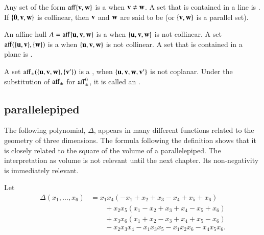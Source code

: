 	
\begin{definition}
  Any set of the form ${\operatorname{aff}}\{{\mathbf v},{\mathbf w}\}$ is a  when
  ${\mathbf v}\ne {\mathbf w}$.  A set that is contained in a line is
  .  If $\{{\mathbf 0},{\mathbf v},{\mathbf w}\}$ is collinear, then
  ${\mathbf v}$ and ${\mathbf w}$ are said to be  (or $\{{\mathbf v},{\mathbf w}\}$
  is a parallel set).
\end{definition}
%
%

\begin{definition}\label{def:plane}	
  An affine hull $A={\operatorname{aff}}\{{\mathbf u},{\mathbf v},{\mathbf w}\}$ is a  when
  $\{{\mathbf u},{\mathbf v},{\mathbf w}\}$ is not collinear.  A set ${\operatorname{aff}}(\{{\mathbf u},{\mathbf v}\},\{{\mathbf w}\})$
  is a  when $\{{\mathbf u},{\mathbf v},{\mathbf w}\}$ is not collinear. A
  set that is contained in a plane is .
\end{definition}
%
%
%
%


\begin{definition} 
A set
  ${\operatorname{aff}}_{\pm}(\{{\mathbf u},{\mathbf v},{\mathbf w}\},\{{\mathbf v}'\})$ is a ,
  when $\{{\mathbf u},{\mathbf v},{\mathbf w},{\mathbf v}'\}$ is not coplanar.  Under the substitution of
  ${\operatorname{aff}}_{\pm}$ for ${\operatorname{aff}}_{\pm}^0$, it is called an
  .
\end{definition}
%
%

\subsection{parallelepiped}\label{sec:piped}
%



The following polynomial, $\Delta$, appears in many different
functions related to the geometry of three dimensions.  The formula
following the definition shows that it is closely related to the
square of the volume of a parallelepiped.  The interpretation as
volume is not relevant until the next chapter.  Its non-negativity is
immediately relevant.  %

\begin{definition}[$\Delta$]\label{def:delta}
  Let
\begin{displaymath}
\begin{array}{lll}
\Delta(x_1,\ldots,x_6) &= x_1 x_4 (- x_1+x_2+x_3- x_4+x_5+x_6)\\
&\qquad+x_2 x_5 (x_1- x_2+x_3+x_4- x_5+x_6)\\
&\qquad+x_3 x_6 (x_1+x_2- x_3+x_4+x_5- x_6)\\
&\qquad- x_2 x_3 x_4- x_1 x_3 x_5- x_1 x_2 x_6- x_4 x_5 x_6.
\end{array}
\end{displaymath}
\end{definition}
%
%

